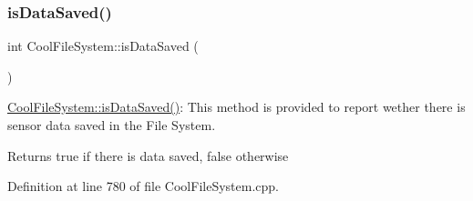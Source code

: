 \subsubsection{\texorpdfstring{is\+Data\+Saved()}{isDataSaved()}}
{\footnotesize\ttfamily int Cool\+File\+System\+::is\+Data\+Saved (\begin{DoxyParamCaption}{ }\end{DoxyParamCaption})}

\hyperlink{class_cool_file_system_ac86a40e7c3a1842f7342f698d34324f9}{Cool\+File\+System\+::is\+Data\+Saved()}\+: This method is provided to report wether there is sensor data saved in the File System.

\begin{DoxyReturn}{Returns}
true if there is data saved, false otherwise 
\end{DoxyReturn}


Definition at line 780 of file Cool\+File\+System.\+cpp.



